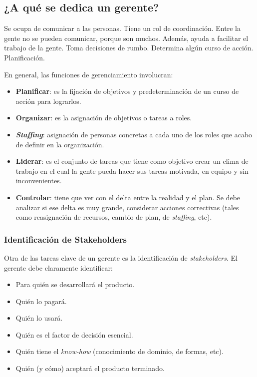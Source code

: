 \documentclass[]{article}
\begin{document}
\subsection{¿A qué se dedica un gerente?}
Se ocupa de comunicar a las personas. Tiene un rol de coordinación. Entre la gente no se pueden comunicar, porque son muchos. Además, ayuda a facilitar el trabajo de la gente. Toma decisiones de rumbo. Determina algún curso de acción. Planificación.

En general, las funciones de gerenciamiento involucran:
\begin{itemize}
	\item \textbf{Planificar}: es la fijación de objetivos y predeterminación de un curso de acción para lograrlos.
	\item \textbf{Organizar}: es la asignación de objetivos o tareas a roles.
	\item \textbf{\emph{Staffing}}: asignación de personas concretas a cada uno de los roles que acabo de definir en la organización.
	\item \textbf{Liderar}: es el conjunto de tareas que tiene como objetivo crear un clima de trabajo en el cual la gente pueda hacer sus tareas motivada, en equipo y sin inconvenientes.
	\item \textbf{Controlar}: tiene que ver con el delta entre la realidad y el plan. Se debe analizar si ese delta es muy grande, considerar acciones correctivas (tales como reasignación de recursos, cambio de plan, de \emph{staffing}, etc).
\end{itemize}

\subsubsection{Identificación de Stakeholders}
Otra de las tareas clave de un gerente es la identificación de \emph{stakeholders}. El gerente debe claramente identificar:
\begin{itemize}
	\item Para quién se desarrollará el producto.
	\item Quién lo pagará.
	\item Quién lo usará.
	\item Quién es el factor de decisión esencial.
	\item Quién tiene el \emph{know-how} (conocimiento de dominio, de formas, etc).
	\item Quién (y cómo) aceptará el producto terminado.
\end{itemize}
\end{document}
